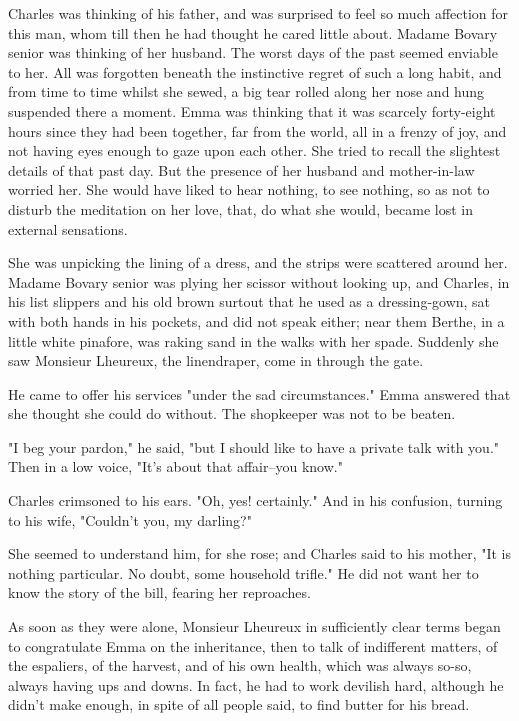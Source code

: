 \documentclass{tufte-book}
\begin{document}
Charles was thinking of his father, and was surprised to feel so much
affection for this man, whom till then he had thought he cared little
about. Madame Bovary senior was thinking of her husband. The worst
days of the past seemed enviable to her. All was forgotten beneath the
instinctive regret of such a long habit, and from time to time whilst
she sewed, a big tear rolled along her nose and hung suspended there a
moment. Emma was thinking that it was scarcely forty-eight hours since
they had been together, far from the world, all in a frenzy of joy, and
not having eyes enough to gaze upon each other. She tried to recall the
slightest details of that past day. But the presence of her husband and
mother-in-law worried her. She would have liked to hear nothing, to see
nothing, so as not to disturb the meditation on her love, that, do what
she would, became lost in external sensations.

She was unpicking the lining of a dress, and the strips were scattered
around her. Madame Bovary senior was plying her scissor without looking
up, and Charles, in his list slippers and his old brown surtout that he
used as a dressing-gown, sat with both hands in his pockets, and did not
speak either; near them Berthe, in a little white pinafore, was raking
sand in the walks with her spade. Suddenly she saw Monsieur Lheureux,
the linendraper, come in through the gate.

He came to offer his services "under the sad circumstances." Emma
answered that she thought she could do without. The shopkeeper was not
to be beaten.

"I beg your pardon," he said, "but I should like to have a private talk
with you." Then in a low voice, "It's about that affair--you know."

Charles crimsoned to his ears. "Oh, yes! certainly." And in his
confusion, turning to his wife, "Couldn't you, my darling?"

She seemed to understand him, for she rose; and Charles said to his
mother, "It is nothing particular. No doubt, some household trifle." He
did not want her to know the story of the bill, fearing her reproaches.

As soon as they were alone, Monsieur Lheureux in sufficiently clear
terms began to congratulate Emma on the inheritance, then to talk of
indifferent matters, of the espaliers, of the harvest, and of his own
health, which was always so-so, always having ups and downs. In fact, he
had to work devilish hard, although he didn't make enough, in spite of
all people said, to find butter for his bread.
\end{document}
